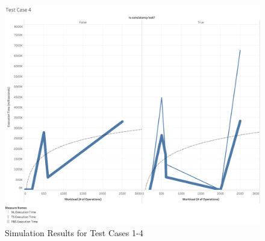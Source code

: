\begin{figure}
\includegraphics[scale=0.11]{images/TestCase4(WL).png}
\caption{Simulation Results for Test Cases 1-4}
\label{results:test_case_graphs_1_4}
\end{figure}

